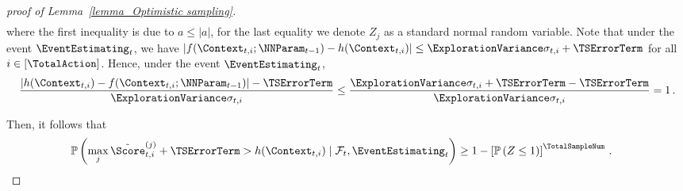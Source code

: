 \documentclass{article}
\theoremstyle{plain}
\begin{document}
\begin{proof}[proof of Lemma~\ref{lemma_Optimistic sampling}]
\begin{align*}
    \end{align*}
where the first inequality is due to $a \le |a|$, for the last equality we denote $Z_j$ as a standard normal random variable. Note that under the event $\EventEstimating_t$, we have $ \left| f(\Context_{t,i};\NNParam_{t-1}) - h(\Context_{t,i}) \right| \le \ExplorationVariance \sigma_{t,i} + \TSErrorTerm$ for all $i \in [\TotalAction]$. Hence, under the event $\EventEstimating_t$,
    \begin{equation*}
        \frac{ \left| h(\Context_{t,i}) - f(\Context_{t,i};\NNParam_{t-1}) \right| - \TSErrorTerm}{\ExplorationVariance \sigma_{t,i}}
        \le \frac{ \ExplorationVariance \sigma_{t,i} + \TSErrorTerm - \TSErrorTerm}{\ExplorationVariance \sigma_{t,i}} = 1 \, .
    \end{equation*}
    
Then, it follows that
    \begin{align*}
        \mathbb{P} \left( \max_j \tilde{\Score}_{t,i}^{(j)} + \TSErrorTerm > h(\Context_{t,i}) \mid
        \mathcal{F}_t, \EventEstimating_t \right)
        & \ge 1 - \left[ \mathbb{P} \left( Z \le 1 \right) \right]^\TotalSampleNum \, .
    \end{align*}
    

\end{proof}
\end{document}
